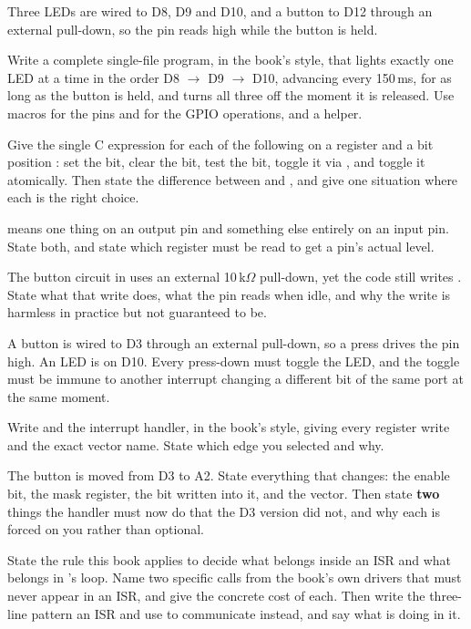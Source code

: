  Three LEDs are wired to D8, D9 and D10, and a button to D12 through an external
pull-down, so the pin reads high while the button is held.

Write a complete single-file program, in the book's style, that lights exactly one LED at a time in
the order D8 $\rightarrow$ D9 $\rightarrow$ D10, advancing every 150\,ms, for as long as the button
is held, and turns all three off the moment it is released. Use macros for the pins and for the GPIO
operations, and a  helper. 

 Give the single C expression for each of the following on a register  and a bit
position : set the bit, clear the bit, test the bit, toggle it via , and toggle
it atomically. Then state the difference between  and
, and give one situation where each is the right choice. 

  means one thing on an output pin and something else entirely on an input
pin. State both, and state which register must be read to get a pin's actual level.

The button circuit in  uses an external 10\,k$\Omega$ pull-down, yet the code still
writes . State what that write does, what the pin reads when idle, and
why the write is harmless in practice but not guaranteed to be. 

\label{exb:q:3}

 A button is wired to D3 through an external pull-down, so a press drives the pin high. An
LED is on D10. Every press-down must toggle the LED, and the toggle must be immune to another
interrupt changing a different bit of the same port at the same moment.

Write  and the interrupt handler, in the book's style, giving every register write and
the exact vector name. State which edge you selected and why. 

 The button is moved from D3 to A2. State everything that changes: the enable bit, the
mask register, the bit written into it, and the vector. Then state \textbf{two} things the handler
must now do that the D3 version did not, and why each is forced on you rather than optional.

 State the rule this book applies to decide what belongs inside an ISR and what belongs in
's loop. Name two specific calls from the book's own drivers that must never appear in
an ISR, and give the concrete cost of each. Then write the three-line pattern an ISR and
 use to communicate instead, and say what  is doing in it. 

